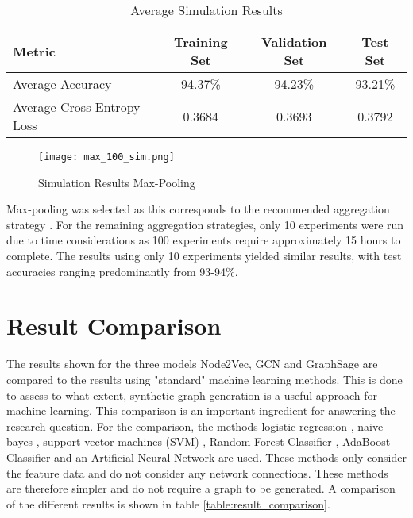   \begin{table}[h]
    \centering
      \begin{tabular}{|l||c|c|c|}
      \hline
      \textbf{Metric} & \textbf{Training Set} & \textbf{Validation Set} & 
      \textbf{Test Set}\\
      \hline\hline
      Average Accuracy & 94.37\% & 94.23\% & 93.21\% \\\hline 
      Average Cross-Entropy Loss & 0.3684 & 0.3693 & 0.3792 \\
      \hline
      \end{tabular}
    \caption{Average Simulation Results}
    \label{table:simulation_results}
  \end{table}

  \begin{figure}[h]
		\centering
		\texttt{[image: max\_100\_sim.png]}
		\caption{Simulation Results Max-Pooling}
        \label{fig:simulation_results}
  \end{figure}

  \noindent Max-pooling was selected as this corresponds to the recommended
  aggregation strategy \citep[p. 9]{hamilton2017inductive}. For the remaining
  aggregation strategies, only 10 experiments were run due to time
  considerations as 100 experiments require approximately 15 hours to complete.
  The results using only 10 experiments yielded similar results, with test
  accuracies ranging predominantly from 93-94\%. 

  \section{Result Comparison}
  \label{section:result_comp}

  The results shown for the three models Node2Vec, GCN and GraphSage are
  compared to the results using "standard" machine learning methods. This is
  done to assess to what extent, synthetic graph generation is a useful
  approach for machine learning. This comparison is an important ingredient for
  answering the research question. For the comparison, the methods logistic
  regression \citep{cramer2002origins}, naive bayes \citep{zhang2004bayes},
  support vector machines (SVM) \citep{platt1999probabilistic,chang2011libsvm},
  Random Forest Classifier \citep{breiman2001random}, AdaBoost Classifier
  \citep{freund1997decision,hastie2009multi} and an Artificial Neural Network
  \citep{mcculloch1943logical} are used. These methods only consider the
  feature data and do not consider any network connections. These methods are
  therefore simpler and do not require a graph to be generated. A comparison of
  the different results is shown in table \ref{table:result_comparison}.

